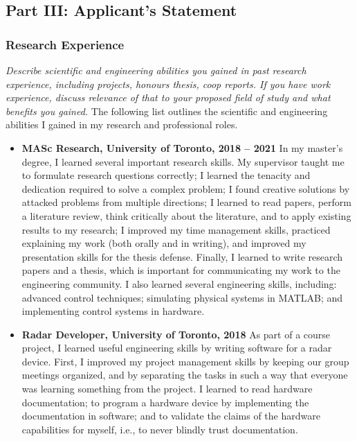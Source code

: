 \documentclass[a4paper,12pt]{article}
\begin{document}
\subsection*{Part III: Applicant's Statement}
\subsubsection*{Research Experience}
\textit{Describe scientific and engineering abilities you gained in past
    research experience, including projects, honours thesis, coop reports. If
    you have work experience, discuss relevance of that to your proposed field
of study and what benefits you gained.}
The following list outlines the scientific and engineering abilities I gained in
my research and professional roles.
\begin{itemize}
    \item \textbf{MASc Research, University of Toronto, 2018 -- 2021}
        In my master's degree, I learned several important research skills.
        My supervisor taught me to formulate research questions
        correctly; I learned the tenacity and dedication required to solve a
        complex problem; I found creative solutions by attacked problems from
        multiple directions; I learned to read papers, perform a literature
        review, think critically about the literature, and to apply existing
        results to my research; I improved my time management skills, practiced
        explaining my work (both orally and in writing), and improved my
        presentation skills for the thesis defense. Finally, I learned to write
        research papers and a thesis, which is important for communicating my
        work to the engineering community.
        I also learned several engineering skills, including: advanced control
        techniques; simulating physical systems in MATLAB; and implementing
        control systems in hardware.

    \item \textbf{Radar Developer, University of Toronto, 2018}
        As part of a course project, I learned useful engineering skills by
        writing software for a radar device.
        First, I improved my project management skills by keeping our group
        meetings organized, and by separating the tasks in such a way
        that everyone was learning something from the project.
        I learned to read hardware documentation; to program a hardware
        device by implementing the documentation in software;
        and to validate the claims of the hardware capabilities for myself,
        i.e., to never blindly trust documentation.


\end{itemize}
\end{document}
